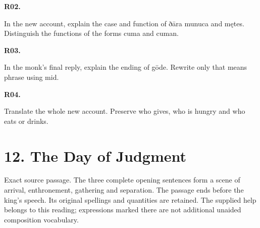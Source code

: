 \par\begin{minipage}{\linewidth}\raggedright
\textbf{R02.}

In the new account, explain the case and function of ðāra munuca and mętes. Distinguish the functions of the forms cuma and cuman.

\end{minipage}\par\addvspace{4pt}

\par\begin{minipage}{\linewidth}\raggedright
\textbf{R03.}

In the monk’s final reply, explain the ending of gōde. Rewrite only that means phrase using mid.

\end{minipage}\par\addvspace{4pt}

\par\begin{minipage}{\linewidth}\raggedright
\textbf{R04.}

Translate the whole new account. Preserve who gives, who is hungry and who eats or drinks.

\end{minipage}\par\addvspace{4pt}

\section*{12. The Day of Judgment}

Exact source passage. The three complete opening sentences form a scene of arrival, enthronement, gathering and separation. The passage ends before the king's speech. Its original spellings and quantities are retained. The supplied help belongs to this reading; expressions marked there are not additional unaided composition vocabulary.

\par\begin{minipage}{\linewidth}\raggedright

\end{minipage}\par
{}
